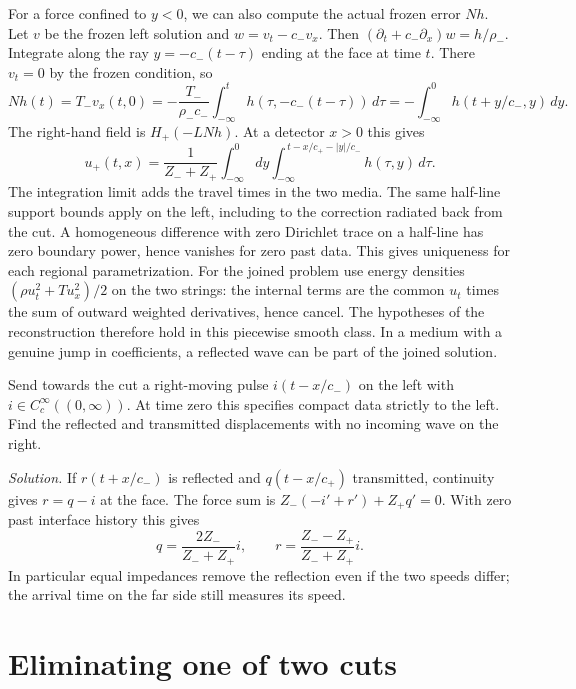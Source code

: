 For a force confined to $y<0$, we can also compute the actual frozen error $Nh$. Let $v$ be the frozen left solution and $w=v_t-c_-v_x$. Then $(\partial_t+c_-\partial_x)w=h/\rho_-$. Integrate along the ray $y=-c_-(t-\tau)$ ending at the face at time $t$. There $v_t=0$ by the frozen condition, so
\[
 Nh(t)=T_-v_x(t,0)=-\frac{T_-}{\rho_-c_-}\int_{-\infty}^t h(\tau,-c_-(t-\tau))\,d\tau
     =-\int_{-\infty}^0 h(t+y/c_-,y)\,dy .
\]
The right-hand field is $H_+(-LNh)$. At a detector $x>0$ this gives
\begin{equation}
 u_+(t,x)=\frac{1}{Z_-+Z_+}\int_{-\infty}^0\!dy\int_{-\infty}^{\,t-x/c_+ - |y|/c_-} h(\tau,y)\,d\tau .\label{f:string-transmission}
\end{equation}
The integration limit adds the travel times in the two media. The same half-line support bounds apply on the left, including to the correction radiated back from the cut. A homogeneous difference with zero Dirichlet trace on a half-line has zero boundary power, hence vanishes for zero past data. This gives uniqueness for each regional parametrization. For the joined problem use energy densities $(\rho u_t^2+T u_x^2)/2$ on the two strings: the internal terms are the common $u_t$ times the sum of outward weighted derivatives, hence cancel. The hypotheses of the reconstruction therefore hold in this piecewise smooth class. In a medium with a genuine jump in coefficients, a reflected wave can be part of the joined solution.

\begin{exercise}
Send towards the cut a right-moving pulse $i(t-x/c_-)$ on the left with $i\in C_c^\infty((0,\infty))$. At time zero this specifies compact data strictly to the left. Find the reflected and transmitted displacements with no incoming wave on the right.
\end{exercise}
\noindent\emph{Solution.} If $r(t+x/c_-)$ is reflected and $q(t-x/c_+)$ transmitted, continuity gives $r=q-i$ at the face. The force sum is $Z_-(-i'+r')+Z_+q'=0$. With zero past interface history this gives
\[
 q=\frac{2Z_-}{Z_-+Z_+}i,\qquad r=\frac{Z_--Z_+}{Z_-+Z_+}i .
\]
In particular equal impedances remove the reflection even if the two speeds differ; the arrival time on the far side still measures its speed.

\section{Eliminating one of two cuts}\label{f:delayed-schur}


